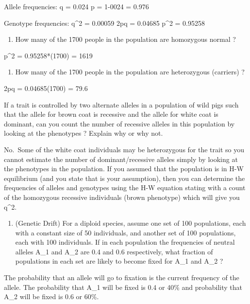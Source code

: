 \documentclass[nofonts,]{tufte-handout}
\providecommand{\tightlist}{%
  \setlength{\itemsep}{0pt}\setlength{\parskip}{0pt}}
\begin{document}
Allele frequencies: q = 0.024 p = 1-0024 = 0.976

Genotype frequencies: q\^{}2 = 0.00059 2pq = 0.04685 p\^{}2 = 0.95258

\begin{enumerate}
\def\labelenumi{\alph{enumi}.}
\setcounter{enumi}{3}
\tightlist
\item
  How many of the 1700 people in the population are homozygous normal ?
\end{enumerate}

p\^{}2 = 0.95258*(1700) = 1619

\begin{enumerate}
\def\labelenumi{\alph{enumi}.}
\setcounter{enumi}{4}
\tightlist
\item
  How many of the 1700 people in the population are heterozygous
  (carriers) ?
\end{enumerate}

2pq = 0.04685(1700) = 79.6

If a trait is controlled by two alternate alleles in a population of
wild pigs such that the allele for brown coat is recessive and the
allele for white coat is dominant, can you count the number of recessive
alleles in this population by looking at the phenotypes ? Explain why or
why not.

No.~Some of the white coat individuals may be heterozygous for the trait
so you cannot estimate the number of dominant/recessive alleles simply
by looking at the phenotypes in the population. If you assumed that the
population is in H-W equilibrium (and you state that is your
assumption), then you can determine the frequencies of alleles and
genotypes using the H-W equation stating with a count of the homozygous
recessive individuals (brown phenotype) which will give you q\^{}2.

\begin{enumerate}
\def\labelenumi{\arabic{enumi}.}
\setcounter{enumi}{5}
\tightlist
\item
  (Genetic Drift) For a diploid species, assume one set of 100
  populations, each with a constant size of 50 individuals, and another
  set of 100 populations, each with 100 individuals. If in each
  population the frequencies of neutral alleles A\_1 and A\_2 are 0.4
  and 0.6 respectively, what fraction of populations in each set are
  likely to become fixed for A\_1 and A\_2 ?
\end{enumerate}

The probability that an allele will go to fixation is the current
frequency of the allele. The probability that A\_1 will be fixed is 0.4
or 40\% and probability that A\_2 will be fixed is 0.6 or 60\%.
\end{document}
